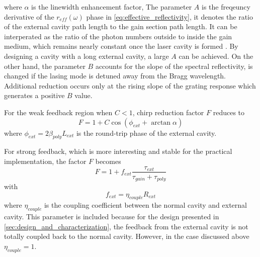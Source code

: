where $\alpha$ is the linewidth enhancement factor,  The parameter $A$ is the freqeuncy derivative of the $r_{eff}(\omega)$ phase in \autoref{eq:effective_reflectivity}, it denotes the ratio of the external cavity path length to the gain section path length. It can be interperated as the ratio of the photon numbers outside to inside the gain medium, which remains nearly constant once the laser cavity is formed \cite{choi2015evaluation}. By designing a cavity with a long external cavity, a large $A$ can be achieved. On the other hand, the parameter $B$ accounts for the slope of the spectral reflectivity, is changed if the lasing mode is detuned away from the Bragg wavelength. Additional reduction occurs only at the rising slope of the grating response which generates a positive $B$ value.

For the weak feedback region when $C<1$, chirp reduction factor $F$ reduces to \cite{petermann2012laser,coldren2012diode}
\begin{equation}
    F=1+C\cos(\phi_{ext}+\arctan\alpha)
    \label{eq:F_weak_feedback}
\end{equation}
where $\phi_{ext}=2\beta_{poly}L_{ext}$ is the round-trip phase of the external cavity.

For strong feedback, which is more interesting and stable for the practical implementation, the factor $F$ becomes \cite{ishii2017narrow}
\begin{equation}
    F=1+f_{ext}\frac{\tau_{ext}}{\tau_{gain}+\tau_{poly}}
    \label{eq:F_strong_feedback}
\end{equation}
with
\begin{equation}
    f_{ext}=\eta_{couple}R_{ext}
    \label{eq:F_f_ext}
\end{equation}
where $\eta_{couple}$ is the coupling coefficient between the normal cavity and external cavity. This parameter is included because for the design presented in \autoref{sec:design_and_characterization}, the feedback from the external cavity is not totally coupled back to the normal cavity. However, in the case discussed above $\eta_{couple}=1$.

